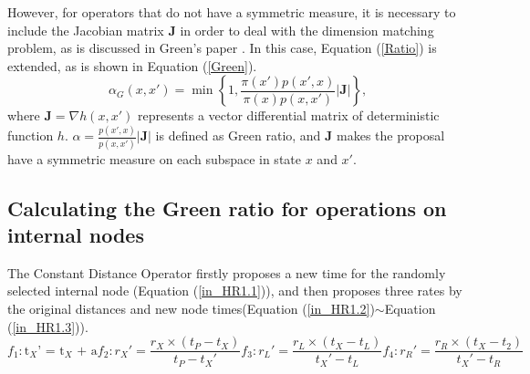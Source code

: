 \documentclass{bmcart}
\begin{document}
\begin{backmatter}
However, for operators that do not have a symmetric measure, it is necessary to include the Jacobian matrix ${\mathbf{J}}$  in order to deal with the dimension matching problem, as is discussed in Green's paper \cite{green1995reversible}. In this case, Equation (\ref{Ratio}) is extended, as is shown in Equation (\ref{Green}).
\begin{equation}\label{Green}
{\alpha_G}(x, x') = \min \left\{ {1,\frac{{\pi (x'){p}(x',x)}}{{\pi (x){p}(x,x')}}}\left|{\mathbf{J}}\right| \right\} \text{,}
\end{equation}
where ${\mathbf{J}} = {\nabla h(x, x')}$ represents a vector differential matrix of deterministic function $h$. $\alpha = \frac{{p}(x',x)}{{p}(x,x')}\left|{\mathbf{J}}\right|$ is defined as Green ratio, and ${\mathbf{J}}$ makes the proposal have a symmetric measure on each subspace in state $x$ and $x'$.

\subsection*{Calculating the Green ratio for operations on internal nodes}
The Constant Distance Operator firstly proposes a new time for the randomly selected internal node (Equation (\ref{in_HR1.1})), and then proposes three rates by the original distances and new node times(Equation (\ref{in_HR1.2})$\sim$Equation (\ref{in_HR1.3})).
\begin{subequations}\label{in_HR1}
\begin{equation}\label{in_HR1.1}
{f_1}:{{\text{t}}_X}{\text{'  =  }}{{\text{t}}_X}{\text{  +  a}} 
\end{equation}  
\begin{equation}\label{in_HR1.2}
{f_2}:{r_X}' = \frac{{{r_X} \times ({t_P} - {t_X})}}{{{t_P} - {t_X}'}} 
\end{equation}  
\begin{equation}
{f_3}:{r_L}' = \frac{{{r_L} \times ({t_X} - {t_L})}}{{{t_X}' - {t_L}}} 
\end{equation}  
\begin{equation}\label{in_HR1.3}
{f_4}:{r_R}' = \frac{{{r_R} \times ({t_X} - {t_2})}}{{{t_X}' - {t_R}}}  
\end{equation}  
\end{subequations}


\end{backmatter}
\end{document}

